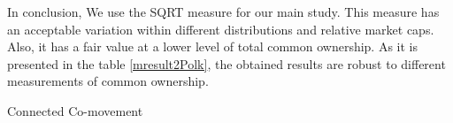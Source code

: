 \begin{appendices}
In conclusion, We use the SQRT measure for our main study. This measure has an acceptable variation within different distributions and relative market caps. Also, it has a fair value at a lower level of total common ownership. 
	As it is presented in the table \ref{mresult2Polk}, the obtained results are robust to different measurements of common ownership.

	{\begin{table}[htbp]
			\caption{Connected Co-movement}
			\label{mresult2Polk}
			\resizebox{1\textwidth}{!}{
			{}
			}
	\end{table}}
	
	\FloatBarrier
	

\end{appendices}
